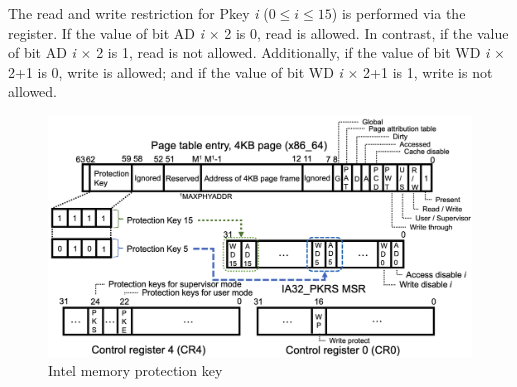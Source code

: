 The read and write restriction for Pkey {\it i} ($0 \leq i \leq 15$) is performed via the
register. If the value of bit AD {\it i} $\times$ 2 is 0, read is allowed. In contrast,
if the value of bit AD {\it i} $\times$ 2 is 1, read is not allowed.
%
Additionally, if the value of bit WD {\it i} $\times$ 2+1 is 0, write is allowed; and if the
value of bit WD {\it i} $\times$ 2+1 is 1, write is not allowed.


\begin{figure}[t]
  \begin{center}
    \hspace{-5.5ex}
    \includegraphics[bb=0 0 1311 744, scale=.220]{./imgs/002_screenshot_2021-07-26_19.13.09.png}
  \end{center}
  \caption{
    Intel memory protection key \cite{intel-mpk}
  }
 \label{fig:mpk_overview}
\end{figure}




